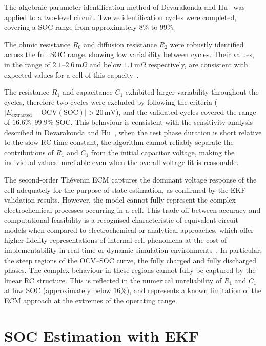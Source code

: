 The algebraic parameter identification method of Devarakonda and Hu~\cite{DEVARAKONDA2014} was 
applied to a two-level circuit. Twelve identification cycles were 
completed, covering a \ac{SOC} range from approximately $8\%$ to $99\%$.

The ohmic resistance $R_0$ and diffusion resistance $R_2$ were robustly identified across the full 
\ac{SOC} range, showing low variability between cycles. Their values, in the range of 
$2.1$--$2.6\,\text{m}\Omega$ and below $1.1\,\text{m}\Omega$ respectively, are consistent with 
expected values for a cell of this capacity~\cite{SOCSOH}.

The resistance $R_1$ and capacitance $C_1$ exhibited larger variability throughout the cycles, 
therefore two cycles were excluded by following the criteria ($|E_{\text{extracted}} - 
\text{OCV}(\text{SOC})| > 20\,\text{mV}$), and the validated cycles covered the range of 
$16.6\%$--$99.9\%$ \ac{SOC}. This behaviour is consistent with the sensitivity analysis described 
in Devarakonda and Hu~\cite{DEVARAKONDA2014}, when the test phase duration is short relative to 
the slow RC time constant, the algorithm cannot reliably separate the contributions of $R_1$ and 
$C_1$ from the initial capacitor voltage, making the individual values unreliable even when the 
overall voltage fit is reasonable.

The second-order Thévenin \acs{ECM} captures the dominant voltage response of the 
cell adequately for the purpose of state estimation, as confirmed by the \ac{EKF} 
validation results. However, the model cannot fully represent the complex 
electrochemical processes occurring in a cell. This trade-off between accuracy and 
computational feasibility is a recognised characteristic of equivalent-circuit 
models when compared to electrochemical or analytical approaches, 
which offer higher-fidelity representations of internal cell phenomena 
at the cost of implementability in real-time or dynamic simulation 
environments~\cite{DiazGonzalez2018}. 
In particular, the steep regions of the 
\ac{OCV}--\ac{SOC} curve, the fully charged and fully discharged phases. The 
complex behaviour in these regions cannot fully be captured by the linear RC 
structure. This is reflected in the numerical unreliability of $R_1$ and $C_1$ at 
low \ac{SOC} (approximately below $16\%$), and represents a known limitation of 
the \ac{ECM} approach at the extremes of the operating range.
\section{SOC Estimation with EKF}

